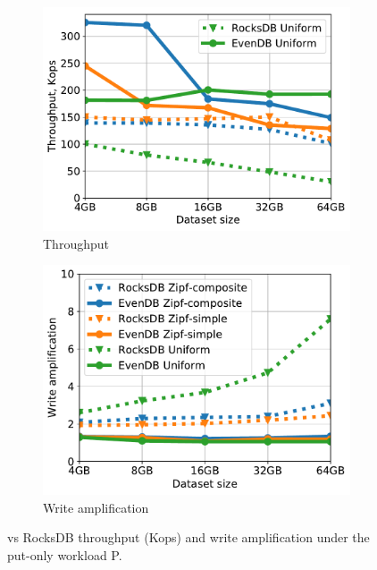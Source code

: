\begin{figure}[tb]
\centering
\begin{subfigure}{0.48\columnwidth}\centering
\includegraphics[width=\textwidth]{figs/Workload_P_line.pdf}
\caption{Throughput}
\label{fig:throughput:p}
\end{subfigure}
\begin{subfigure}{0.48\columnwidth}\centering
\includegraphics[width=\textwidth]{figs/write_amp_p_line.pdf}
\caption{Write amplification }
\label{fig:writeamp}
\end{subfigure}
\caption{
{\sys\/ vs RocksDB throughput (Kops) and write amplification under the put-only workload P.}
}
\label{fig:putonly}
\end{figure}

